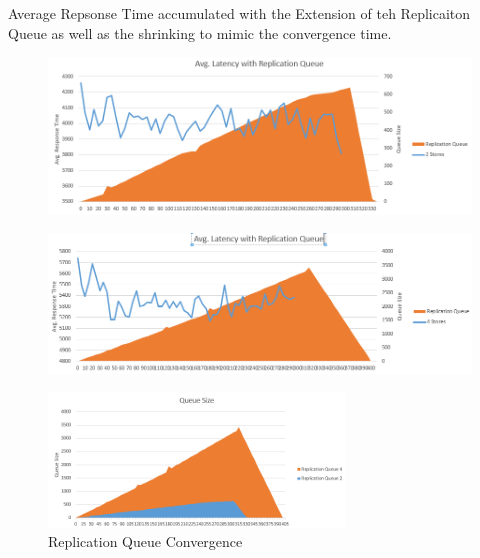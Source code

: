 Average Repsonse Time accumulated with the Extension of teh Replicaiton Queue as well as the shrinking
to mimic the convergence time. 

\begin{figure}
    \centering
    \begin{minipage}{.5\textwidth}
      \centering
      \includegraphics[width=.9\linewidth]{Figures/2latency_queue.PNG}
      \label{fig:converge_2}
    \end{minipage}%
    \begin{minipage}{.5\textwidth}
      \centering
      \includegraphics[width=.9\linewidth]{Figures/4latence_queue.PNG}
      \label{fig:converge_4}
    \end{minipage}
\end{figure}



\begin{figure}[t] 
    \centering 
    \includegraphics[width=0.7\textwidth]{Figures/queuesize24.PNG}
    \caption{Replication Queue Convergence}
    \label{fig:converge24}
\end{figure}




